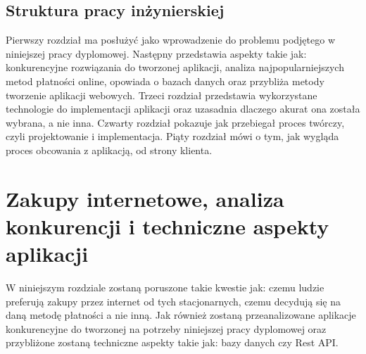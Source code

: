 \documentclass[12pt]{article}
\begin{document}
\begin{sloppypar}
{  \subsection{Struktura pracy inżynierskiej}
  {
    Pierwszy rozdział ma posłużyć jako wprowadzenie do problemu podjętego w niniejszej pracy dyplomowej.
    Następny przedstawia aspekty takie jak: konkurencyjne rozwiązania do tworzonej aplikacji,
    analiza najpopularniejszych metod płatności online, opowiada o bazach danych oraz przybliża
    metody tworzenie aplikacji webowych.
    Trzeci rozdział przedstawia wykorzystane technologie do implementacji aplikacji oraz uzasadnia dlaczego
    akurat ona została wybrana, a nie inna.
    Czwarty rozdział pokazuje jak przebiegał proces twórczy, czyli projektowanie i implementacja. 
    Piąty rozdział mówi o tym, jak wygląda proces obcowania z aplikacją, od strony klienta.
  }
}

\section{Zakupy internetowe, analiza konkurencji i techniczne aspekty aplikacji}
{
  W niniejszym rozdziale zostaną poruszone takie kwestie jak: czemu ludzie preferują zakupy przez internet od tych stacjonarnych, 
  czemu decydują się na daną metodę płatności a nie inną. 
  Jak również zostaną przeanalizowane aplikacje konkurencyjne do tworzonej na potrzeby niniejszej pracy dyplomowej 
  oraz przybliżone zostaną techniczne aspekty takie jak: bazy danych czy Rest API.
}
\end{sloppypar}
\end{document}
